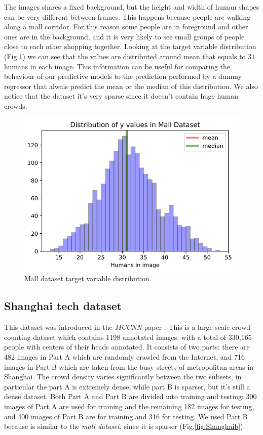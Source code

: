 \documentclass[10pt,twocolumn,letterpaper]{article}
\begin{document}
The images shares a fixed background, but the height and width of human shapes can be very different between frames. This happens because people are walking along a mall corridor. For this reason some people are in foreground and other ones are in the background, and it is very likely to see small groups of people close to each other shopping together. Looking at the target variable distribution (Fig.\ref{fig:distplot}) we can see that the values are distributed around mean that equals to $31$ humans in each image. This information can be useful for comparing the behaviour of our predictive models to the prediction performed by a dummy regressor that alwais predict the mean or the median of this distribution. We also notice that the dataset it's very sparse since it doesn't contain huge human crowds.

\begin{figure}[h!]%
	\includegraphics[width=0.8\columnwidth]{pics/meanmedian.png}
	\centering
	\caption{Mall dataset target variable distribution.}
	\centering
	\label{fig:distplot}
\end{figure}

\subsection{Shanghai tech dataset}
This dataset was introduced in the \textit{MCCNN} paper \cite{zhang2016single}. This is a large-scale crowd counting dataset  which contains 1198 annotated images, with
a total of 330,165 people with centers of their heads annotated. It consists of two parts: there are 482 images in Part A which are randomly crawled from the Internet, and 716 images in Part B which are taken from the busy streets of metropolitan areas in Shanghai. The crowd density varies significantly between the two subsets, in particular the part A is extremely dense, while part B is sparser, but it's still a dense dataset. Both Part A and Part B are divided into training and testing: 300
images of Part A are used for training and the remaining 182 images for testing, and 400 images of Part B are for training and 316 for testing. We used Part B because is similar to the \textit{mall dataset}, since it is sparser (Fig.\ref{fig:Shanghaib}).
\end{document}
